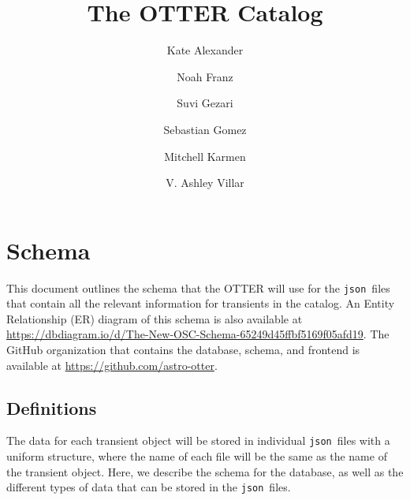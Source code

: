 \documentclass[tighten]{aastex631}
\newcommand{\json}{{\tt json}}
\begin{document}
\title{The OTTER Catalog}

\author[0000-0002-8297-2473]{Kate Alexander}
\UA

\author[0000-0003-4537-3575]{Noah Franz}
\UA

\author[0000-0003-3703-5154]{Suvi Gezari}
\STScI\JHU

\author[0000-0001-6395-6702]{Sebastian Gomez}
\STScI

\author{Mitchell Karmen}
\JHU

\author[0000-0002-5814-4061]{V. Ashley Villar}
\CfA

\tableofcontents

\section{Schema} \label{sec:schema}

This document outlines the schema that the OTTER will use for the \json\ files that contain all the relevant information for transients in the catalog. An Entity Relationship (ER) diagram of this schema is also available at \url{https://dbdiagram.io/d/The-New-OSC-Schema-65249d45ffbf5169f05afd19}. The GitHub organization that contains the database, schema, and frontend is available at \url{https://github.com/astro-otter}.

\subsection{Definitions}\label{sec:definitions}

The data for each transient object will be stored in individual \json\ files with a uniform structure, where the name of each file will be the same as the name of the transient object. Here, we describe the schema for the database, as well as the different types of data that can be stored in the \json\ files.
\end{document}
